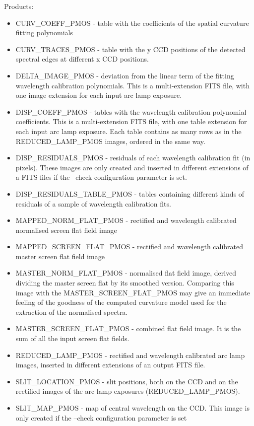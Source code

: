 Products:
\begin{itemize}

\item CURV\_COEFF\_PMOS - table with the coefficients of the spatial curvature fitting polynomials         	
\item CURV\_TRACES\_PMOS - table with the y CCD positions of the detected spectral edges at different x CCD positions.        	
\item DELTA\_IMAGE\_PMOS - deviation from the linear term of the fitting wavelength calibration polynomials. This is a multi-extension FITS file, with one image extension for each input arc lamp exposure.    	
\item DISP\_COEFF\_PMOS - tables with the wavelength calibration polynomial coefficients. This is a multi-extension FITS file, with one table extension for each input arc lamp exposure. Each table contains as
many rows as in the REDUCED\_LAMP\_PMOS images, ordered in the same way.   	
\item DISP\_RESIDUALS\_PMOS - residuals of each wavelength calibration fit (in pixels). These images are only created and inserted in different extensions of a FITS files if the --check configuration parameter is set.
\item DISP\_RESIDUALS\_TABLE\_PMOS - tables containing different kinds of residuals of a sample of wavelength calibration fits. 
\item MAPPED\_NORM\_FLAT\_PMOS - rectified and wavelength calibrated normalised screen flat field image 
\item MAPPED\_SCREEN\_FLAT\_PMOS - rectified and wavelength calibrated master screen flat field image 	
\item MASTER\_NORM\_FLAT\_PMOS - normalised flat field image, derived dividing the master screen flat by its
smoothed version. Comparing this image with the MASTER\_SCREEN\_FLAT\_PMOS may give an immediate feeling of the goodness of the computed curvature model used for the extraction of the normalised spectra.    	
\item MASTER\_SCREEN\_FLAT\_PMOS - combined flat field image. It is the sum of all the input screen flat fields.	
\item REDUCED\_LAMP\_PMOS - rectified and wavelength calibrated arc lamp images, inserted in different extensions of an output FITS file.
\item SLIT\_LOCATION\_PMOS - slit positions, both on the CCD and on the rectified images of the arc lamp exposures (REDUCED\_LAMP\_PMOS).       	
\item SLIT\_MAP\_PMOS - map of central wavelength on the CCD. This image is only created if the --check configuration parameter is set

\end{itemize}
